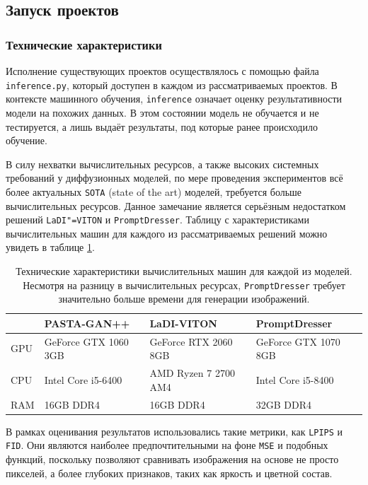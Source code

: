 \subsection{Запуск проектов}
\subsubsection{Технические характеристики}
Исполнение существующих проектов осуществлялось с помощью файла \texttt{inference.py}, который доступен в каждом из рассматриваемых проектов. В контексте машинного обучения, \texttt{inference} означает оценку результативности модели на похожих данных. В этом состоянии модель не обучается и не тестируется, а лишь выдаёт результаты, под которые ранее происходило обучение.

В силу нехватки вычислительных ресурсов, а также высоких системных требований у диффузионных моделей, по мере проведения экспериментов всё более актуальных \texttt{SOTA} (state of the art) моделей, требуется больше вычислительных ресурсов. Данное замечание является серьёзным недостатком решений \texttt{LaDI"=VITON} и \texttt{PromptDresser}. Таблицу с характеристиками вычислительных машин для каждого из рассматриваемых решений можно увидеть в таблице \ref{tab:tech_models}.


\begin{table}[H]
\small
\begin{tabularx}{\linewidth}{lXXX}
      & PASTA-GAN++ & LaDI-VITON & PromptDresser \\
\hline
GPU  & GeForce GTX 1060 3GB & GeForce RTX 2060 8GB & GeForce GTX 1070 8GB \\
CPU  & Intel Core i5-6400   & AMD Ryzen 7 2700 AM4     & Intel Core i5-8400 \\
RAM  & 16GB DDR4     & 16GB DDR4       & 32GB DDR4 \\
\end{tabularx}
\caption{Технические характеристики вычислительных машин для каждой из моделей. Несмотря на разницу в вычислительных ресурсах, \texttt{PromptDresser} требует значительно больше времени для генерации изображений.}
\label{tab:tech_models}
\end{table}


В рамках оценивания результатов использовались такие метрики, как \texttt{LPIPS} и \texttt{FID}. Они являются наиболее предпочтительными на фоне \texttt{MSE} и подобных функций, поскольку позволяют сравнивать изображения на основе не просто пикселей, а более глубоких признаков, таких как яркость и цветной состав.

